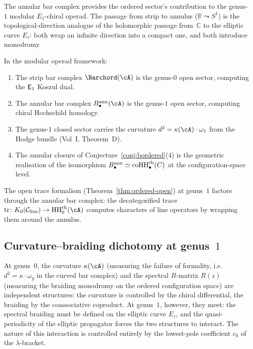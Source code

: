 \begin{remark}
\label{rem:annular-modular}
The annular bar complex provides the ordered sector's
contribution to the genus-$1$ modular $E_1$-chiral operad.
The passage from strip to annulus
($\mathbb{R}\leadsto S^1$) is the topological-direction
analogue of the holomorphic passage from~$\mathbb{C}$ to the
elliptic curve $E_\tau$: both wrap an infinite direction into
a compact one, and both introduce monodromy.

In the modular operad framework:
\begin{enumerate}[label=(\roman*)]
\item The strip bar complex
 $\Barchord(\cA)$ is the genus-$0$ open sector,
 computing the $\mathsf{E}_1$ Koszul dual.
\item The annular bar complex
 $B^{\mathrm{ann}}_\bullet(\cA)$ is the genus-$1$ open
 sector, computing chiral Hochschild homology.
\item The genus-$1$ closed sector carries the curvature
 $d^2=\kappa(\cA)\cdot\omega_1$ from the Hodge bundle
 (Vol~I, Theorem~D).
\item The annular closure of
 Conjecture~\textup{\ref{conj:bordered}(4)} is the geometric
 realisation of the isomorphism
 $B^{\mathrm{ann}}_\bullet\simeq
 \operatorname{coHH}^{\mathrm{ch}}_\bullet(C)$
 at the configuration-space level.
\end{enumerate}
The open trace formalism (Theorem~\ref{thm:ordered-open})
at genus~$1$ factors through the annular bar complex: the
decategorified trace $\mathrm{tr}\colon K_0(\mathcal{C}_{\mathrm{line}})\to
\HH^{\mathrm{ch}}_0(\cA)$ computes characters of line operators
by wrapping them around the annulus.
\end{remark}

\subsection{Curvature--braiding dichotomy at genus~$1$}

At genus~$0$, the curvature $\kappa(\cA)$ (measuring the failure of
formality, i.e.\ $d^2=\kappa\cdot\omega_g$ in the curved bar complex)
and the spectral $R$-matrix $R(z)$ (measuring the braiding monodromy
on the ordered configuration space) are independent structures:
the curvature is controlled by the chiral differential,
the braiding by the coassociative coproduct.
At genus~$1$, however, they meet: the spectral braiding must be
defined on the elliptic curve $E_\tau$, and the quasi-periodicity
of the elliptic propagator forces the two structures to interact.
The nature of this interaction is controlled entirely by the
lowest-pole coefficient $c_0$ of the $\lambda$-bracket.

